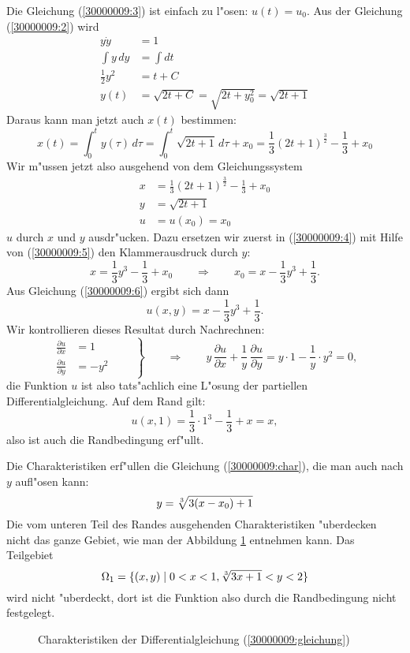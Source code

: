 \begin{loesung}
\begin{teilaufgaben}
Die Gleichung (\ref{30000009:3}) ist einfach zu l"osen: $u(t)=u_0$.
Aus der Gleichung (\ref{30000009:2}) wird
\begin{align*}
y\dot y&=1\\
\int y\,dy&=\int dt\\
\frac12y^2&=t+C\\
y(t)&=\sqrt{2t+C}=\sqrt{2t+y_0^2}=\sqrt{2t+1}
\end{align*}
Daraus kann man jetzt auch $x(t)$ bestimmen:
\[
x(t)= \int_0^ty(\tau)\,d\tau
=\int_0^t\sqrt{2t+1}\,d\tau + x_0
=\frac13(2t+1)^{\frac{3}{2}}-\frac13+x_0
\]
Wir m"ussen jetzt also ausgehend von dem Gleichungssystem
\begin{align}
x&=\frac13(2t+1)^{\frac32}-\frac13+x_0\label{30000009:4}\\
y&=\sqrt{2t+1}\label{30000009:5}\\
u&=u(x_0)=x_0\label{30000009:6}
\end{align}
$u$ durch $x$ und $y$ ausdr"ucken. Dazu ersetzen wir zuerst in 
(\ref{30000009:4}) mit Hilfe von (\ref{30000009:5}) den Klammerausdruck
durch $y$:
\begin{equation}
x=\frac13y^3-\frac13+x_0\qquad\Rightarrow\qquad x_0=x-\frac13y^3+\frac13.
\label{30000009:char}
\end{equation}
Aus Gleichung (\ref{30000009:6}) ergibt sich dann
\[
u(x,y)=x-\frac13y^3+\frac13.
\]
Wir kontrollieren dieses Resultat durch Nachrechnen:
\[
\left.
\begin{aligned}
\frac{\partial u}{\partial x}
&=
1
\\
\frac{\partial u}{\partial y}
&=
-y^2
\end{aligned}
\qquad
\right\}
\qquad
\Rightarrow
\qquad
y\,\frac{\partial u}{\partial x}
+\frac1y\,\frac{\partial u}{\partial y}
=
y\cdot 1-\frac1y\cdot y^2=0,
\]
die Funktion $u$ ist also tats"achlich eine L"osung der partiellen
Differentialgleichung. Auf dem Rand gilt:
\[
u(x,1)=\frac13\cdot1^3-\frac13+x=x,
\]
also ist auch die Randbedingung erf"ullt.
\item
Die Charakteristiken erf"ullen die Gleichung (\ref{30000009:char}), die
man auch nach $y$ aufl"osen kann:
\[
y=\root3\of{3(x-x_0)+1}
\]
Die vom unteren Teil des Randes ausgehenden Charakteristiken "uberdecken
nicht das ganze Gebiet, wie man der Abbildung \ref{30000009:charakteristiken}
entnehmen kann. Das Teilgebiet 
\[
\Omega_1=\{(x,y)\;|\; 0<x<1, \root3\of{3x+1} < y < 2\}
\]
wird nicht "uberdeckt, dort ist die Funktion also durch die Randbedingung
nicht festgelegt.
\qedhere
\end{teilaufgaben}
\begin{figure}
\begin{center}
\end{center}
\caption{Charakteristiken der Differentialgleichung (\ref{30000009:gleichung})
\label{30000009:charakteristiken}}
\end{figure}
\end{loesung}

